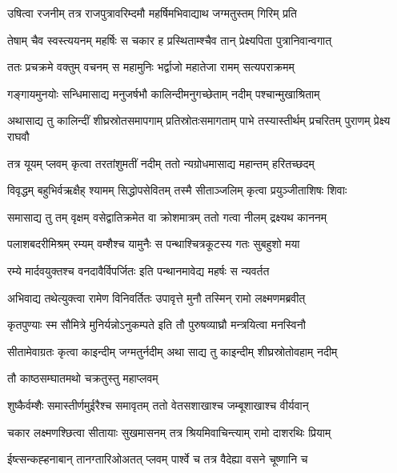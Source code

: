 
\twolineshloka
{उषित्वा रजनीम् तत्र राजपुत्रावरिम्दमौ}
{महर्षिमभिवाद्याथ जग्मतुस्तम् गिरिम् प्रति} %

\twolineshloka
{तेषाम् चैव स्वस्त्ययनम् महर्षिः स चकार ह}
{प्रस्थिताम्श्चैव तान् प्रेक्ष्यपिता पुत्रानिवान्वगात्} %

\twolineshloka
{ततः प्रचक्रमे वक्तुम् वचनम् स महामुनिः}
{भर्द्वाजो महातेजा रामम् सत्यपराक्रमम्} %

\twolineshloka
{गङ्गायमुनयोः सन्धिमासाद्य मनुजर्षभौ}
{कालिन्दीमनुगच्छेताम् नदीम् पश्चान्मुखाश्रिताम्} %

\twolineshloka
{अथासाद्य तु कालिन्दीं शीघ्रस्रोतसमापगाम् प्रतिस्रोतःसमागताम् पाभे}
{तस्यास्तीर्थम् प्रचरितम् पुराणम् प्रेक्ष्य राघवौ} %

\twolineshloka
{तत्र यूयम् प्लवम् कृत्वा तरतांशुमतीं नदीम्}
{ततो न्यग्रोधमासाद्य महान्तम् हरितच्छदम्} %

\twolineshloka
{विवृद्धम् बहुभिर्वऋक्षैह् श्यामम् सिद्धोपसेवितम्}
{तस्मै सीताञ्जलिम् कृत्वा प्रयुञ्जीताशिषः शिवाः} %

\twolineshloka
{समासाद्य तु तम् वृक्षम् वसेद्वातिक्रमेत वा}
{क्रोशमात्रम् ततो गत्वा नीलम् द्रक्ष्यथ काननम्} %

\twolineshloka
{पलाशबदरीमिश्रम् रम्यम् वम्शैश्च यामुनैः}
{स पन्थाश्चित्रकूटस्य गतः सुबहुशो मया} %

\twolineshloka
{रम्ये मार्दवयुक्तश्च वनदावैर्विपर्जितः}
{इति पन्थानमावेद्य महर्षः स न्यवर्तत} %

\twolineshloka
{अभिवाद्य तथेत्युक्त्वा रामेण विनिवर्तितः}
{उपावृत्ते मुनौ तस्मिन् रामो लक्ष्मणमब्रवीत्} %

\twolineshloka
{कृतपुण्याः स्म सौमित्रे मुनिर्यन्नोऽनुकम्पते}
{इति तौ पुरुषव्याघ्रौ मन्त्रयित्वा मनस्विनौ} %

\twolineshloka
{सीतामेवाग्रतः कृत्वा काइन्दीम् जग्मतुर्नदीम्}
{अथा साद्य तु काइन्दीम् शीघ्रस्रोतोवहाम् नदीम्} %

\onelineshloka
{तौ काष्ठसम्घातमथो चक्रतुस्तु महाप्लवम्} %

\twolineshloka
{शुष्कैर्वम्शैः समास्तीर्णमुईरैश्च समावृतम्}
{ततो वेतसशाखाश्च जम्बूशाखाश्च वीर्यवान्} %

\twolineshloka
{चकार लक्ष्मणश्छित्वा सीतायाः सुखमासनम्}
{तत्र श्रियमिवाचिन्त्याम् रामो दाशरथिः प्रियाम्} %

\twolineshloka
{ईष्त्सन्कह्हनाबान् तानग्तारिओअतत् प्लवम्}
{पार्श्वे च तत्र वैदेह्या वसने चूष्णानि च} %

